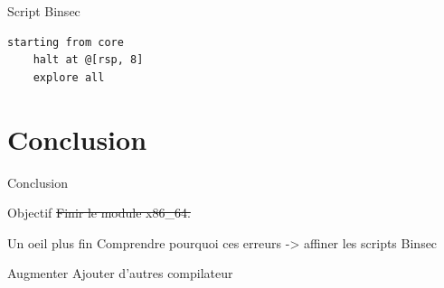 \documentclass[A4,svgnames,9pt,aspectratio=169]{beamer}
\begin{document}
\begin{frame}[fragile]{Script Binsec}

  \begin{lstlisting}[style=INIStyle, caption={\textbf{*}.ini}, gobble=4]
    starting from core
    halt at @[rsp, 8]
    explore all
  \end{lstlisting}



\end{frame}


\section{Conclusion}
\frame{\sectionpage}

\begin{frame}{Conclusion}
  \begin{block}{Objectif}
    \sout{Finir le module x86\_64.}
  \end{block}

  \begin{block}{Un oeil plus fin}
    Comprendre pourquoi ces erreurs -> affiner les scripts Binsec
  \end{block}
  
  \begin{block}{Augmenter}
    Ajouter d'autres compilateur
  \end{block}

\end{frame}


\frame{\merci}
\end{document}

